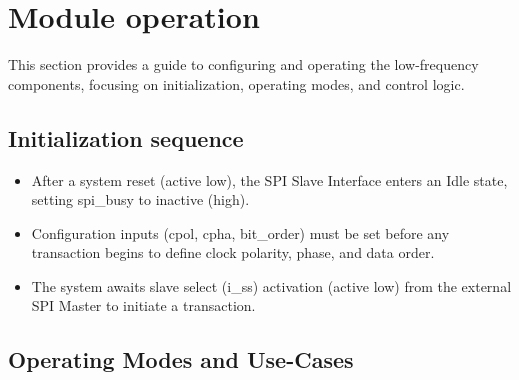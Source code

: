 \section{Module operation}\label{sec:operation}
This section provides a guide to configuring and operating the low-frequency components, focusing on initialization, operating modes, and control logic.

\subsection{Initialization sequence}

\begin{itemize}[nosep]
    \item After a system reset (active low), the SPI Slave Interface enters an Idle state, setting spi\_busy to inactive (high).
    \item Configuration inputs (cpol, cpha, bit\_order) must be set before any transaction begins to define clock polarity, phase, and data order.
    \item The system awaits slave select (i\_ss) activation (active low) from the external SPI Master to initiate a transaction.
\end{itemize}


\subsection{Operating Modes and Use-Cases}

